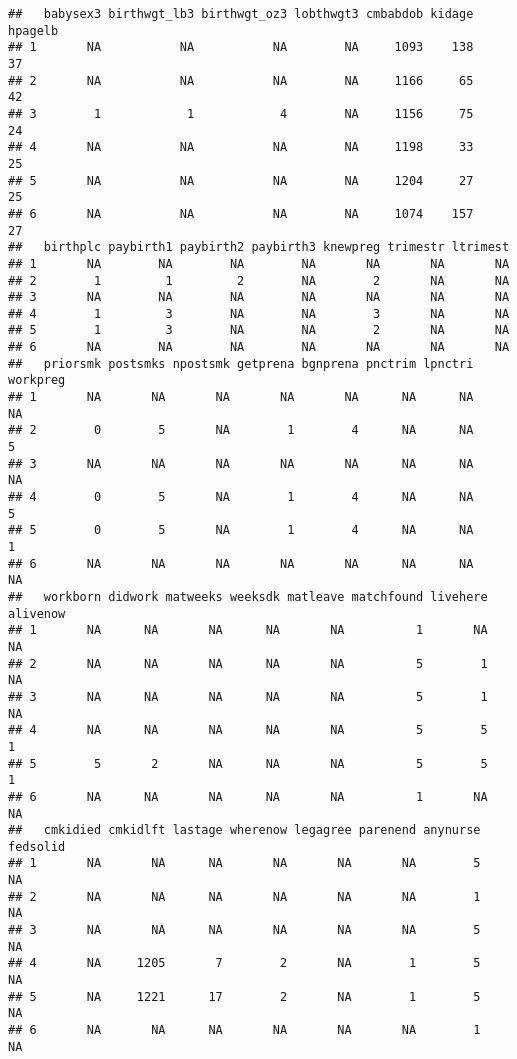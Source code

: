 \documentclass[]{article}
\begin{document}
\begin{verbatim}
##   babysex3 birthwgt_lb3 birthwgt_oz3 lobthwgt3 cmbabdob kidage hpagelb
## 1       NA           NA           NA        NA     1093    138      37
## 2       NA           NA           NA        NA     1166     65      42
## 3        1            1            4        NA     1156     75      24
## 4       NA           NA           NA        NA     1198     33      25
## 5       NA           NA           NA        NA     1204     27      25
## 6       NA           NA           NA        NA     1074    157      27
##   birthplc paybirth1 paybirth2 paybirth3 knewpreg trimestr ltrimest
## 1       NA        NA        NA        NA       NA       NA       NA
## 2        1         1         2        NA        2       NA       NA
## 3       NA        NA        NA        NA       NA       NA       NA
## 4        1         3        NA        NA        3       NA       NA
## 5        1         3        NA        NA        2       NA       NA
## 6       NA        NA        NA        NA       NA       NA       NA
##   priorsmk postsmks npostsmk getprena bgnprena pnctrim lpnctri workpreg
## 1       NA       NA       NA       NA       NA      NA      NA       NA
## 2        0        5       NA        1        4      NA      NA        5
## 3       NA       NA       NA       NA       NA      NA      NA       NA
## 4        0        5       NA        1        4      NA      NA        5
## 5        0        5       NA        1        4      NA      NA        1
## 6       NA       NA       NA       NA       NA      NA      NA       NA
##   workborn didwork matweeks weeksdk matleave matchfound livehere alivenow
## 1       NA      NA       NA      NA       NA          1       NA       NA
## 2       NA      NA       NA      NA       NA          5        1       NA
## 3       NA      NA       NA      NA       NA          5        1       NA
## 4       NA      NA       NA      NA       NA          5        5        1
## 5        5       2       NA      NA       NA          5        5        1
## 6       NA      NA       NA      NA       NA          1       NA       NA
##   cmkidied cmkidlft lastage wherenow legagree parenend anynurse fedsolid
## 1       NA       NA      NA       NA       NA       NA        5       NA
## 2       NA       NA      NA       NA       NA       NA        1       NA
## 3       NA       NA      NA       NA       NA       NA        5       NA
## 4       NA     1205       7        2       NA        1        5       NA
## 5       NA     1221      17        2       NA        1        5       NA
## 6       NA       NA      NA       NA       NA       NA        1       NA

\end{verbatim}
\end{document}
